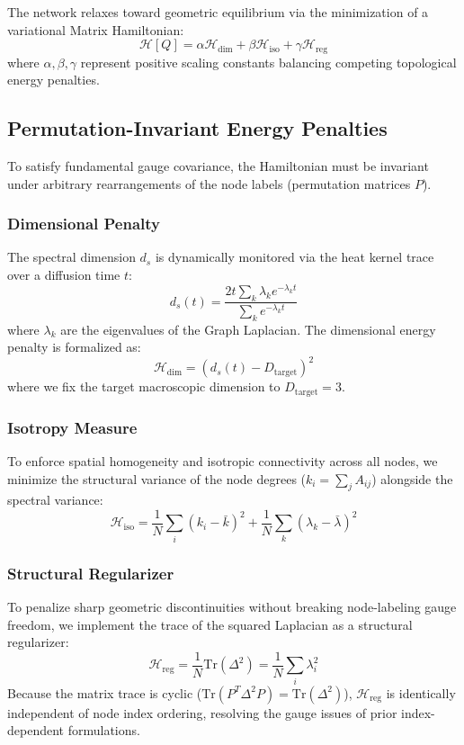 \documentclass[11pt,twocolumn,a4paper]{article}
\begin{document}
The network relaxes toward geometric equilibrium via the minimization of a variational Matrix Hamiltonian:
\begin{equation}
\mathcal{H}[Q] = \alpha \mathcal{H}_{\text{dim}} + \beta \mathcal{H}_{\text{iso}} + \gamma \mathcal{H}_{\text{reg}}
\end{equation}
where $\alpha, \beta, \gamma$ represent positive scaling constants balancing competing topological energy penalties.

\subsection{Permutation-Invariant Energy Penalties}
To satisfy fundamental gauge covariance, the Hamiltonian must be invariant under arbitrary rearrangements of the node labels (permutation matrices $P$). 

\subsubsection{Dimensional Penalty}
The spectral dimension $d_s$ is dynamically monitored via the heat kernel trace over a diffusion time $t$:
\begin{equation}
\label{eq:spectral_dim}
d_s(t) = \frac{2t \sum_{k} \lambda_k e^{-\lambda_k t}}{\sum_{k} e^{-\lambda_k t}}
\end{equation}
where $\lambda_k$ are the eigenvalues of the Graph Laplacian. The dimensional energy penalty is formalized as:
\begin{equation}
\mathcal{H}_{\text{dim}} = (d_s(t) - D_{\text{target}})^2
\end{equation}
where we fix the target macroscopic dimension to $D_{\text{target}} = 3$.

\subsubsection{Isotropy Measure}
To enforce spatial homogeneity and isotropic connectivity across all nodes, we minimize the structural variance of the node degrees ($k_i = \sum_j A_{ij}$) alongside the spectral variance:
\begin{equation}
\mathcal{H}_{\text{iso}} = \frac{1}{N} \sum_{i} (k_i - \bar{k})^2 + \frac{1}{N} \sum_{k} (\lambda_k - \bar{\lambda})^2
\end{equation}

\subsubsection{Structural Regularizer}
To penalize sharp geometric discontinuities without breaking node-labeling gauge freedom, we implement the trace of the squared Laplacian as a structural regularizer:
\begin{equation}
\mathcal{H}_{\text{reg}} = \frac{1}{N} \text{Tr}(\Delta^2) = \frac{1}{N} \sum_{i} \lambda_i^2
\end{equation}
Because the matrix trace is cyclic ($\text{Tr}(P^T \Delta^2 P) = \text{Tr}(\Delta^2)$), $\mathcal{H}_{\text{reg}}$ is identically independent of node index ordering, resolving the gauge issues of prior index-dependent formulations.
\end{document}
